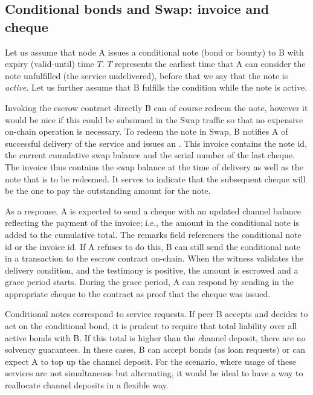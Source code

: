 \subsection{Conditional bonds and Swap: invoice and cheque}

Let us assume that node A issues a conditional note (bond or bounty) to B with expiry (valid-until) time $T$. $ T$ represents the earliest time that A can consider the note unfulfilled (the service undelivered), before that we say that the note is \emph{active}. Let us further assume that B fulfills the condition while the note is active.

Invoking the escrow contract directly B can of course redeem the note, however it would be nice if this could be subsumed in the Swap traffic so that no expensive on-chain operation is necessary. 
To redeem the note in Swap, B notifies A of successful delivery of the service and issues  an . This invoice contains the note id, the current cumulative swap balance and the serial number of the last cheque. The invoice thus contains the swap balance at the time of delivery as well as the note that is to be redeemed. It serves to indicate that the subsequent cheque will be the one to pay the outstanding amount for the note.

As a response, A is expected to send a cheque with an updated channel balance reflecting the payment of the invoice; i.e., the amount in the conditional note is added to the cumulative total. The remarks field references the conditional note id or the invoice id. If A refuses to do this, B can still send the conditional note in a transaction to the escrow contract on-chain. When the witness validates the delivery condition, and the testimony is positive, the amount is escrowed and a grace period starts. During the grace period, A can respond by sending in the appropriate cheque to the contract as proof that the cheque was issued.

Conditional notes correspond to service requests. If peer B accepts and decides to act on the conditional bond, it is prudent to require that total liability over all active bonds with B. If this total is higher than the channel deposit, there are no solvency guarantees. In these cases, B can accept bonds (as loan requests) or can expect A to top up the channel deposit. For the scenario, where usage of these services are not simultaneous but alternating, it would be ideal to have a way to reallocate channel deposits in a flexible way.

